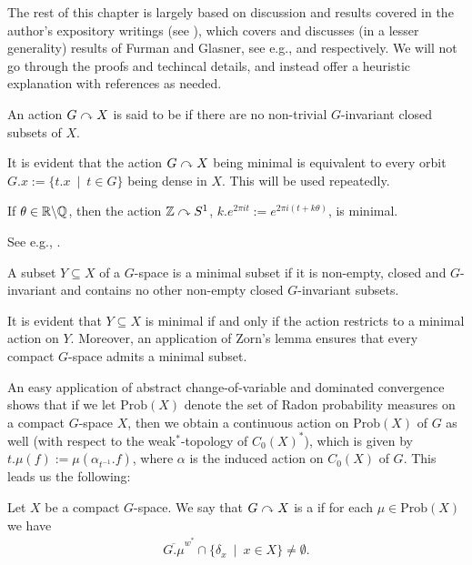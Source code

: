The rest of this chapter is largely based on discussion and results covered in the author's expository writings (see \cite{bscp}), which covers and discusses (in a lesser generality) results of Furman and Glasner, see e.g., \cite{furman2003minimal} and \cite{glasner1976proximal} respectively. We will not go through the proofs and techincal details, and instead offer a heuristic explanation with references as needed.
\begin{definition}
	An action $G \stackrel{}{\curvearrowright} X$ is said to be  if there are no non-trivial $G$-invariant closed subsets of $X$.
\end{definition}
\begin{remark}
	It is evident that the action $G \stackrel{}{\curvearrowright} X$ being minimal is equivalent to every orbit $G.x := \{t.x \ \mid \ t \in G\}$ being dense in $X$. This will be used repeatedly.
\end{remark}
\begin{example}
	If $\theta \in \mathbb{R} \backslash \mathbb{Q}$, then the action $\mathbb{Z} \stackrel{}{\curvearrowright} S^1$, $k.e^{2\pi i t}:= e^{2 \pi i (t+k\theta)}$, is minimal.	
\end{example}
See e.g., \mbox{\cite[Example 4.6]{bscp}}. 
\begin{definition}
	A subset $Y \subseteq X$ of a $G$-space is a minimal subset if it is non-empty, closed and $G$-invariant and contains no other non-empty closed $G$-invariant subsets.
\end{definition}
\begin{remark}
	It is evident that $Y \subseteq X$ is minimal if and only if the action restricts to a minimal action on $Y$. Moreover, an application of Zorn's lemma ensures that every compact $G$-space admits a minimal subset.
\end{remark}
An easy application of abstract change-of-variable and dominated convergence shows that if we let $\mathrm{Prob}(X)$ denote the set of Radon probability measures on a compact $G$-space $X$, then we obtain a continuous action on $\mathrm{Prob}(X)$ of $G$ as well (with respect to the weak$^*$-topology of $C_0(X)^*$), which is given by $t.\mu(f) := \mu(\alpha_{t^{-1}}.f)$, where $\alpha$ is the induced action on $C_0(X)$ of $G$. This leads us the following:
\begin{definition}
	Let $X$ be a compact $G$-space. We say that $G \stackrel{}{\curvearrowright} X$ is a  if for each $\mu \in \mathrm{Prob}(X)$ we have
	\begin{align*}
		\overline{G.\mu}^{w^*} \cap \{\delta_x \ \mid \ x \in X\} \neq \emptyset.
	\end{align*}
\end{definition}
